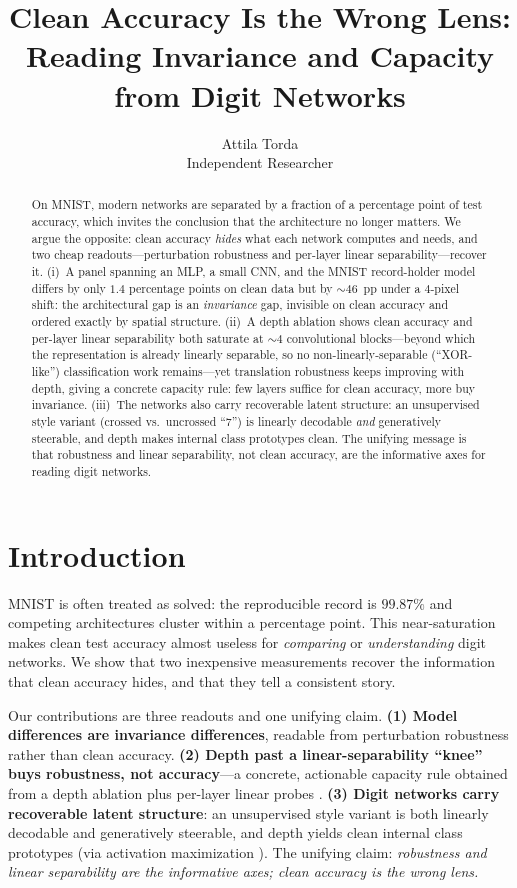 \documentclass{article}
\title{Clean Accuracy Is the Wrong Lens:\\
       Reading Invariance and Capacity from Digit Networks}
\author{%
  Attila Torda \\
  Independent Researcher \\
}
\begin{document}
\maketitle

\begin{abstract}
On MNIST, modern networks are separated by a fraction of a percentage point of test accuracy,
which invites the conclusion that the architecture no longer matters. We argue the opposite: clean
accuracy \emph{hides} what each network computes and needs, and two cheap readouts---perturbation
robustness and per-layer linear separability---recover it. (i)~A panel spanning an MLP, a small
CNN, and the MNIST record-holder model differs by only $1.4$ percentage points on clean data but by
$\sim\!46$~pp under a $4$-pixel shift: the architectural gap is an \emph{invariance} gap, invisible
on clean accuracy and ordered exactly by spatial structure. (ii)~A depth ablation shows clean
accuracy and per-layer linear separability both saturate at $\sim\!4$ convolutional blocks---beyond
which the representation is already linearly separable, so no non-linearly-separable
(``XOR-like'') classification work remains---yet translation robustness keeps improving with depth,
giving a concrete capacity rule: few layers suffice for clean accuracy, more buy invariance.
(iii)~The networks also carry recoverable latent structure: an unsupervised style variant
(crossed vs.\ uncrossed ``7'') is linearly decodable \emph{and} generatively steerable, and depth
makes internal class prototypes clean. The unifying message is that robustness and linear
separability, not clean accuracy, are the informative axes for reading digit networks.
\end{abstract}

\section{Introduction}
MNIST \cite{LeCun1998} is often treated as solved: the reproducible record is $99.87\%$
\cite{An2020} and competing architectures cluster within a percentage point. This near-saturation
makes clean test accuracy almost useless for \emph{comparing} or \emph{understanding} digit
networks. We show that two inexpensive measurements recover the information that clean accuracy
hides, and that they tell a consistent story.

Our contributions are three readouts and one unifying claim. \textbf{(1) Model differences are
invariance differences}, readable from perturbation robustness rather than clean accuracy.
\textbf{(2) Depth past a linear-separability ``knee'' buys robustness, not accuracy}---a concrete,
actionable capacity rule obtained from a depth ablation plus per-layer linear probes
\cite{Alain2017}. \textbf{(3) Digit networks carry recoverable latent structure}: an unsupervised
style variant is both linearly decodable and generatively steerable, and depth yields clean
internal class prototypes (via activation maximization \cite{Erhan2009,Simonyan2014,Olah2017}).
The unifying claim: \emph{robustness and linear separability are the informative axes; clean
accuracy is the wrong lens.}
\end{document}
